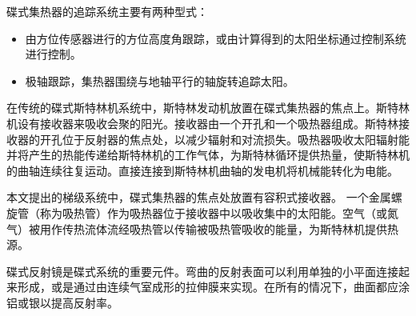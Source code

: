 碟式集热器的追踪系统主要有两种型式：\cite{Adkins1987}
\begin{itemize}
  \item 由方位传感器进行的方位高度角跟踪，或由计算得到的太阳坐标通过控制系统进行控制。
  \item 极轴跟踪，集热器围绕与地轴平行的轴旋转追踪太阳。
\end{itemize}

在传统的碟式斯特林机系统中，斯特林发动机放置在碟式集热器的焦点上。斯特林机设有接收器来吸收会聚的阳光。接收器由一个开孔和一个吸热器组成。斯特林接收器的开孔位于反射器的焦点处，以减少辐射和对流损失。吸热器吸收太阳辐射能并将产生的热能传递给斯特林机的工作气体，为斯特林循环提供热量，使斯特林机的曲轴连续往复运动。直接连接到斯特林机曲轴的发电机将机械能转化为电能。

本文提出的梯级系统中，碟式集热器的焦点处放置有容积式接收器。 一个金属螺旋管（称为吸热管）作为吸热器位于接收器中以吸收集中的太阳能。空气（或氮气）被用作传热流体流经吸热管以传输被吸热管吸收的能量，为斯特林机提供热源。

碟式反射镜是碟式系统的重要元件。弯曲的反射表面可以利用单独的小平面连接起来形成，或是通过由连续气室成形的拉伸膜来实现。在所有的情况下，曲面都应涂铝或银以提高反射率。


